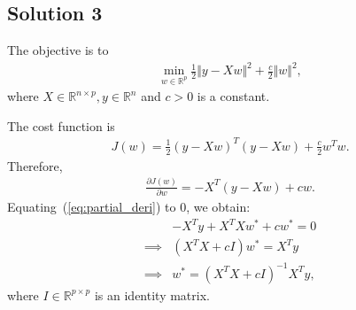 \subsection*{Solution 3}
The objective is to
\begin{align*}
	\min\limits_{w \in \mathbb{R}^p} \frac{1}{2} \Vert y - Xw \Vert^2 + \frac{c}{2}\Vert w \Vert^2,
\end{align*}
where $X \in \mathbb{R}^{n \times p}, y \in \mathbb{R}^n$ and $c>0$ is a constant.

The cost function is
\begin{align*}
	J(w) = \frac{1}{2} (y-Xw)^T(y-Xw) + \frac{c}{2}w^Tw.
\end{align*}
Therefore,
\begin{align}\label{eq:partial_deri}
	\frac{\partial J(w)}{\partial w} = -X^T(y-Xw) + c w.
\end{align}
Equating~(\ref{eq:partial_deri}) to $0$, we obtain:
\begin{align*}
	& -X^Ty+X^TXw^*+cw^* = 0\\
	\implies & (X^TX+cI)w^* = X^Ty\\
	\implies & w^* = (X^TX+cI)^{-1}X^Ty,
\end{align*}
where $I \in \mathbb{R}^{p \times p}$ is an identity matrix.